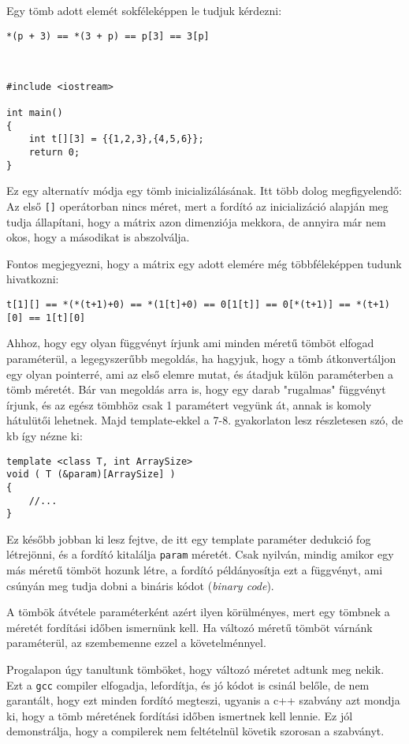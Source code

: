 \documentclass[a4paper,11.5pt]{article}
\begin{document}
		Egy tömb adott elemét sokféleképpen le tudjuk kérdezni:
		
		{\centering \texttt{*(p + 3) == *(3 + p) == p[3] == 3[p]} \par}
		\
		\begin{lstlisting}
#include <iostream>

int main()
{
	int t[][3] = {{1,2,3},{4,5,6}};
	return 0;
}
		\end{lstlisting}
		Ez egy alternatív módja egy tömb inicializálásának. Itt több dolog megfigyelendő: Az első \texttt{[]} operátorban nincs méret, mert a fordító az inicializáció alapján meg tudja állapítani, hogy a mátrix azon dimenziója mekkora, de annyira már nem okos, hogy a másodikat is abszolválja.
		
		\medskip
		Fontos megjegyezni, hogy a mátrix egy adott elemére még többféleképpen tudunk hivatkozni:
		
		{\centering \texttt{t[1][] == *(*(t+1)+0) == *(1[t]+0) == 0[1[t]] == 0[*(t+1)] == *(t+1)[0] == 1[t][0] } \par}
	\begin{note}
		Ahhoz, hogy egy olyan függvényt írjunk ami minden méretű tömböt elfogad paraméterül, a legegyszerűbb megoldás, ha hagyjuk, hogy a tömb átkonvertáljon egy olyan pointerré, ami az első elemre mutat, és átadjuk külön paraméterben a tömb méretét. Bár van megoldás arra is, hogy egy darab "rugalmas" függvényt írjunk, és az egész tömbhöz csak 1 paramétert vegyünk át, annak is komoly hátulütői lehetnek. Majd template-ekkel a 7-8. gyakorlaton lesz részletesen szó, de kb így nézne ki:
		\begin{lstlisting}
template <class T, int ArraySize>
void ( T (&param)[ArraySize] )
{
	//...
}
		\end{lstlisting}
		\smallskip
		Ez később jobban ki lesz fejtve, de itt egy template paraméter dedukció fog létrejönni, és a fordító kitalálja \texttt{param} méretét. Csak nyilván, mindig amikor egy más méretű tömböt hozunk létre, a fordító példányosítja ezt a függvényt, ami csúnyán meg tudja dobni a bináris kódot (\textit{binary code}).
		
		\smallskip
		A tömbök átvétele paraméterként azért ilyen körülményes, mert egy tömbnek a méretét fordítási időben ismernünk kell. Ha változó méretű tömböt várnánk paraméterül, az szembemenne ezzel a követelménnyel.  
	\end{note}
	\begin{note}
		Progalapon úgy tanultunk tömböket, hogy változó méretet adtunk meg nekik. Ezt a \texttt{gcc} compiler elfogadja, lefordítja, és jó kódot is csinál belőle, de nem garantált, hogy ezt minden fordító megteszi, ugyanis a c++ szabvány azt mondja ki, hogy a tömb méretének fordítási időben ismertnek kell lennie. Ez jól demonstrálja, hogy a compilerek nem feltételnül követik szorosan a szabványt.
	\end{note}
\end{document}
